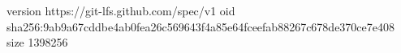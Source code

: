 version https://git-lfs.github.com/spec/v1
oid sha256:9ab9a67cddbe4ab0fea26c569643f4a85e64fceefab88267c678de370ce7e408
size 1398256
